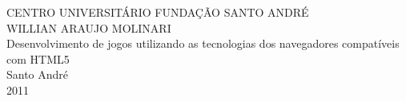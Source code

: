 \thispagestyle{empty}
\begin{center}
\large CENTRO UNIVERSITÁRIO FUNDAÇÃO SANTO ANDRÉ \\
\vspace{1cm}
\large WILLIAN ARAUJO MOLINARI \\
\vspace{8cm}
\huge Desenvolvimento de jogos utilizando as tecnologias dos navegadores compatíveis com HTML5 \\
\vspace{8cm}
\large Santo André \\
\large 2011 \\
\end{center}
